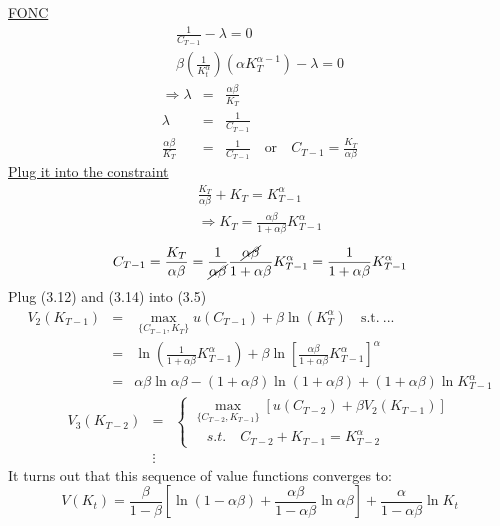 \documentclass[twoside]{article}
\begin{document}
\underline{FONC}
\begin{eqnarray}
    \frac{1}{C_{T-1}} - \lambda = 0\\
    \beta (\frac{1}{K_t^\alpha})(\alpha K_T^{\alpha-1}) - \lambda = 0   
\end{eqnarray}
\begin{eqnarray}
    \Longrightarrow
    \lambda &=& \frac{\alpha \beta}{K_T}\\
    \lambda &=& \frac{1}{C_{T-1}}\\
    \frac{\alpha \beta}{K_T} &=& \frac{1}{C_{T-1}} \quad \text{or} \quad C_{T-1} = \frac{K_T}{\alpha \beta}
\end{eqnarray}
\underline{Plug it into the constraint}
\begin{eqnarray}
    \frac{K_T}{\alpha \beta} + K_T = K_{T-1}^\alpha \\
    \Longrightarrow K_T = \frac{\alpha \beta}{1+\alpha \beta} K_{T-1}^\alpha 
\end{eqnarray}
\begin{equation}
    C_{T-1} = \frac{K_T}{\alpha \beta} = \frac{1}{\cancel{\alpha \beta}} \frac{\cancel{\alpha \beta}}{1+\alpha \beta} K_{T-1}^\alpha = \frac{1}{1+\alpha \beta} K_{T-1}^\alpha 
\end{equation}
Plug (3.12) and (3.14) into (3.5)
\begin{eqnarray}
    V_2(K_{T-1}) 
    &=& \max\limits_{\{C_{T-1}, K_{T}\}} u(C_{T-1})+ \beta \ln (K_T^\alpha) \quad \text{s.t.}~...\\
    &=& \ln( \frac{1}{1+\alpha \beta} K_{T-1}^\alpha ) + \beta \ln[\frac{\alpha \beta}{1+\alpha \beta} K_{T-1}^\alpha ]^\alpha\\
    &=& \alpha \beta \ln \alpha \beta - (1+ \alpha \beta) \ln (1+ \alpha \beta) + (1+ \alpha \beta) \ln K_{T-1}^\alpha
\end{eqnarray}
\begin{eqnarray}
    V_3(K_{T-2}) &=& \begin{cases}
        \max\limits_{\{C_{T-2}, K_{T-1}\}} [u(C_{T-2})+ \beta V_2(K_{T-1})]\\
        \quad s.t. \quad C_{T-2} + K_{T-1} = K_{T-2}^\alpha
    \end{cases}\\
    &\vdots&
\end{eqnarray}
It turns out that this sequence of value functions converges to:
\begin{equation}
    V(K_t) = \frac{\beta}{1- \beta}[\ln (1-\alpha \beta) + \frac{\alpha \beta}{1- \alpha \beta}\ln \alpha \beta] + \frac{\alpha}{1- \alpha \beta} \ln K_t
\end{equation}
\end{document}
